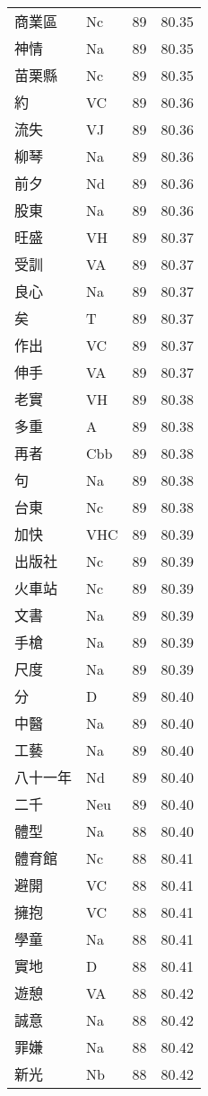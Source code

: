\documentclass[twocolumn]{book}
\begin{document}
\begin{supertabular}{llrr}
商業區 & Nc & 89 &  80.35\\
神情 & Na & 89 &  80.35\\
苗栗縣 & Nc & 89 &  80.35\\
約 & VC & 89 &  80.36\\
流失 & VJ & 89 &  80.36\\
柳琴 & Na & 89 &  80.36\\
前夕 & Nd & 89 &  80.36\\
股東 & Na & 89 &  80.36\\
旺盛 & VH & 89 &  80.37\\
受訓 & VA & 89 &  80.37\\
良心 & Na & 89 &  80.37\\
矣 & T & 89 &  80.37\\
作出 & VC & 89 &  80.37\\
伸手 & VA & 89 &  80.37\\
老實 & VH & 89 &  80.38\\
多重 & A & 89 &  80.38\\
再者 & Cbb & 89 &  80.38\\
句 & Na & 89 &  80.38\\
台東 & Nc & 89 &  80.38\\
加快 & VHC & 89 &  80.39\\
出版社 & Nc & 89 &  80.39\\
火車站 & Nc & 89 &  80.39\\
文書 & Na & 89 &  80.39\\
手槍 & Na & 89 &  80.39\\
尺度 & Na & 89 &  80.39\\
分 & D & 89 &  80.40\\
中醫 & Na & 89 &  80.40\\
工藝 & Na & 89 &  80.40\\
八十一年 & Nd & 89 &  80.40\\
二千 & Neu & 89 &  80.40\\
體型 & Na & 88 &  80.40\\
體育館 & Nc & 88 &  80.41\\
避開 & VC & 88 &  80.41\\
擁抱 & VC & 88 &  80.41\\
學童 & Na & 88 &  80.41\\
實地 & D & 88 &  80.41\\
遊憩 & VA & 88 &  80.42\\
誠意 & Na & 88 &  80.42\\
罪嫌 & Na & 88 &  80.42\\
新光 & Nb & 88 &  80.42\\

\end{supertabular}
\end{document}
